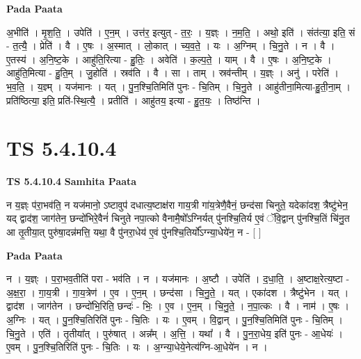 \documentclass[17pt]{extarticle}
\begin{document}
\textbf{Pada Paata} \newline

अ॒भीति॑ । मृ॒श॒ति॒ । उपेति॑ । ए॒न॒म् । उत्त॑र॒ इत्युत् - त॒रः॒ । य॒ज्ञ्ः । न॒म॒ति॒ । अथो॒ इति॑ । संत॑त्या॒ इति॒ सं - त॒त्यै॒ । प्रेति॑ । वै । ए॒षः । अ॒स्मात् । लो॒कात् । च्य॒व॒ते॒ । यः । अ॒ग्निम् । चि॒नु॒ते । न । वै । ए॒तस्य॑ । अ॒नि॒ष्ट॒के । आहु॑ति॒रित्या - हु॒तिः॒ । अवेति॑ । क॒ल्प॒ते॒ । याम् । वै । ए॒षः । अ॒नि॒ष्ट॒के । आहु॑ति॒मित्या - हु॒ति॒म् । जु॒होति॑ । स्रव॑ति । वै । सा । ताम् । स्रव॑न्तीम् । य॒ज्ञ्ः । अनु॑ । परेति॑ । भ॒व॒ति॒ । य॒ज्ञ्म् । यज॑मानः । यत् । पु॒न॒श्चि॒तिमिति॑ पुनः - चि॒तिम् । चि॒नु॒ते । आहु॑तीना॒मित्या-हु॒ती॒ना॒म् । प्रति॑ष्ठित्या॒ इति॒ प्रति॑-स्थि॒त्यै॒ । प्रतीति॑ । आहु॑तय॒ इत्या - हु॒त॒यः॒ । तिष्ठ॑न्ति ।  \newline




\section*{ TS 5.4.10.4 }

\textbf{TS 5.4.10.4 } \newline
\textbf{Samhita Paata} \newline

न य॒ज्ञ्ः प॑रा॒भव॑ति॒ न यज॑मानो॒ ऽष्टावुप॑ दधात्य॒ष्टाक्ष॑रा गाय॒त्री गा॑य॒त्रेणै॒वैनं॒ छन्द॑सा चिनुते॒ यदेका॑दश॒ त्रैष्टु॑भेन॒ यद् द्वाद॑श॒ जाग॑तेन॒ छन्दो॑भिरे॒वैनं॑ चिनुते नपा॒त्को वैनामै॒षो᳚ऽग्निर्यत् पु॑नश्चि॒तिर्य ए॒वं ॅवि॒द्वान् पु॑नश्चि॒तिं चि॑नु॒त आ तृ॒तीया॒त् पुरु॑षा॒दन्न॑मत्ति॒ यथा॒ वै पु॑नरा॒धेय॑ ए॒वं पु॑नश्चि॒तिर्यो᳚ऽग्न्या॒धेये॑न॒ न - [  ] \newline

\textbf{Pada Paata} \newline

न । य॒ज्ञ्ः । प॒रा॒भव॒तीति॑ परा - भव॑ति । न । यज॑मानः । अ॒ष्टौ । उपेति॑ । द॒धा॒ति॒ । अ॒ष्टाक्ष॒रेत्य॒ष्टा - अ॒क्ष॒रा॒ । गा॒य॒त्री । गा॒य॒त्रेण॑ । ए॒व । ए॒न॒म् । छन्द॑सा । चि॒नु॒ते॒ । यत् । एका॑दश । त्रैष्टु॑भेन । यत् । द्वाद॑श । जाग॑तेन । छन्दो॑भि॒रिति॒ छन्दः॑ - भिः॒ । ए॒व । ए॒न॒म् । चि॒नु॒ते॒ । न॒पा॒त्कः । वै । नाम॑ । ए॒षः । अ॒ग्निः । यत् । पु॒न॒श्चि॒तिरिति॑ पुनः - चि॒तिः । यः । ए॒वम् । वि॒द्वान् । पु॒न॒श्चि॒तिमिति॑ पुनः - चि॒तिम् । चि॒नु॒ते । एति॑ । तृ॒तीया᳚त् । पुरु॑षात् । अन्न᳚म् । अ॒त्ति॒ । यथा᳚ । वै । पु॒न॒रा॒धेय॒ इति॑ पुनः - आ॒धेयः॑ । ए॒वम् । पु॒न॒श्चि॒तिरिति॑ पुनः - चि॒तिः । यः । अ॒ग्न्या॒धेये॒नेत्य॑ग्नि-आ॒धेये॑न । न ।  \newline
\end{document}
